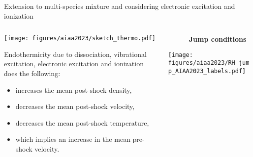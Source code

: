 \documentclass[9pt, aspectratio=1609]{beamer}
\begin{document}
\begin{frame}{\normalsize Extension to multi-species mixture and considering electronic excitation and ionization}
    \setlength{\leftmargini}{0.5em}
    \begin{columns}[c]
        \begin{column}{.45\textwidth}%
        \vspace{-0.3cm}
        \begin{center}
            \texttt{[image: figures/aiaa2023/sketch\_thermo.pdf]}
        \end{center}
        
        Endothermicity due to dissociation, vibrational excitation, electronic excitation and ionization does the following:
        \vspace{0.3cm}
        
        \begin{itemize}
            \item increases the mean post-shock density,
            \item decreases the mean post-shock velocity,
            \item decreases the mean post-shock temperature,
            \item which implies an increase in the mean pre-shock velocity.
        \end{itemize}
        \end{column}%
        \begin{column}{.45\textwidth}
        \begin{center}
            \vspace{-0.3cm}\textbf{$\quad\quad\quad$Jump conditions}\\ \vspace{0.3cm}
            
            \texttt{[image: figures/aiaa2023/RH\_jump\_AIAA2023\_labels.pdf]}
        \end{center}
        \end{column}%
    \end{columns}
\end{frame}
\end{document}
